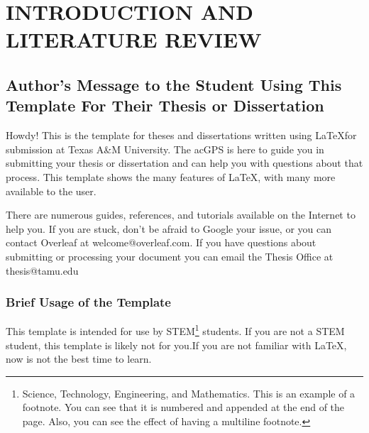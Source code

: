 %
%
%
%
%



\pagestyle{plain} %
\setcounter{page}{1}


\chapter{\uppercase {Introduction and Literature Review}}

\section{Author's Message to the Student Using This Template For Their Thesis or Dissertation}

Howdy! This is the template for theses and dissertations written using \LaTeX for submission at Texas A\&M University. The ac{GPS} is here to guide you in submitting your thesis or dissertation and can help you with questions about that process. This template shows the many features of \LaTeX, with many more available to the user.

There are numerous guides, references, and tutorials available on the Internet to help you. If you are stuck, don't be afraid to Google your issue, or you can contact Overleaf at welcome@overleaf.com. If you have questions about submitting or processing your document you can email the Thesis Office at thesis@tamu.edu


\subsection{Brief Usage of the Template}

This template is intended for use by STEM\footnote{Science, Technology, Engineering, and Mathematics. This is an example of a footnote. You can see that it is numbered and appended at the end of the page. Also, you can see the effect of having a multiline footnote.} students. If you are not a STEM student, this template is likely not for you.If you are not familiar with LaTeX, now is not the best time to learn.

